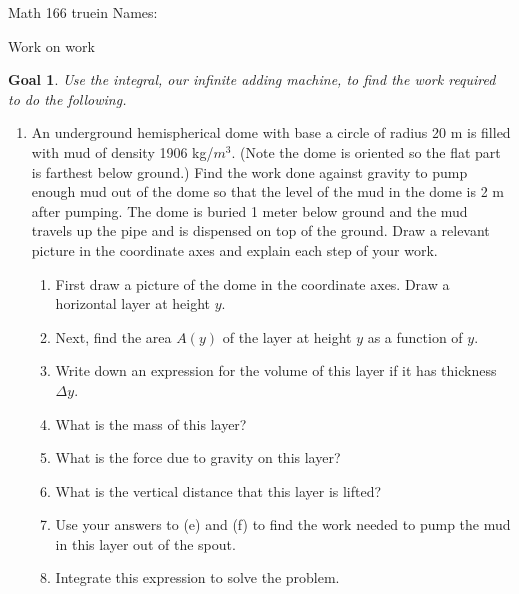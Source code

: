 \documentclass[12pt]{article}
\newtheorem*{goal}{Goal}
\begin{document}
\pagestyle{empty} %

\noindent
{Math 166  truein  Names:\ \hrulefill}

\noindent
{Work on work}

\begin{goal} \rm
Use the integral, our infinite adding machine, to find the work required to do the following.
\end{goal}


\begin{enumerate}

\item An underground hemispherical dome with base a circle of radius 20 m is filled with mud of density 1906 kg/$m^3$. (Note the dome  is oriented so the flat part is farthest below ground.) Find the work done against gravity to pump enough mud out of the dome so that the level of the mud in the dome is 2 m after pumping. The dome is buried 1 meter below ground and the mud travels up the pipe and is dispensed on top of the ground. Draw a relevant picture in the coordinate axes and explain each step of your work.

\begin{enumerate}
\item First draw a picture of the dome in the coordinate axes. 
Draw a horizontal layer at height $y$.
\vfill\vfill
\item Next, find the area $A(y)$ of the layer at height $y$ as a function of $y$.
\vfill
\item Write down an expression for the volume of this layer if it has thickness $\Delta y$.
\vfill
\item What is the mass of this layer?
\vfill
\pagebreak
\item What is the force due to gravity on this layer? 
\vfill
\item What is the vertical distance that this layer is lifted?
\vfill
\item Use your answers to (e) and (f) to find the work needed to pump the mud in this layer out of the spout.
\vfill
\item Integrate this expression to solve the problem.
\vfill
\end{enumerate}


\end{enumerate}
\end{document}
